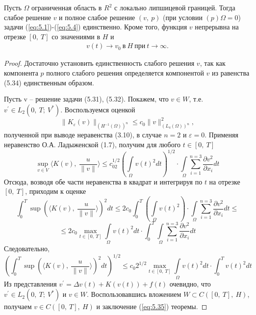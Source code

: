 \begin{theorem}
    Пусть $\Omega$ ограниченная область в $R^2$ с локально липшицевой границей. Тогда слабое решение $v$ и полное слабое решение $(v, \ p)$
    (при условии $(p) \Omega = 0$) задачи (\ref{eq:5.1})-(\ref{eq:5.4}) единственно. Кроме того, функция $v$ непрерывна на отрезке $[0, \ T]$ со значениями в $H$ и
    \begin{equation}\label{eq:5.35}
        \begin{gathered}
            v(t) \rightarrow v_0 \ \textrm{в} \ H \ \textrm{при} \ t \rightarrow \infty.
        \end{gathered}
    \end{equation}
\end{theorem}
\begin{proof}
    Достаточно установить единственность слабого решения $v$, так как компонента $p$ полного слабого решения определяется компонентой $v$
    из равенства (5.34) единственным образом.

    Пусть v -- решение задачи (5.31), (5.32). Покажем, что $v \in W$, т.е. $v^\prime \in L_2(0, \ T; \ V^\ast)$.
    Воспользуемся оценкой
    $$\parallel K_\varepsilon (v) \parallel_{(H^{-1}(\Omega))^n} \le c_0 \parallel v \parallel^2_{(L_4(\Omega))^n},$$
    полученной при выводе неравенства (3.10), в случае $n = 2$ и $\varepsilon = 0$. Применяя неравенство О.А. Ладыженской (1.7), получим для любого $t \in [0, \ T]$
    $$\sup\limits_{v\in V}\langle K(v), \ \frac{u}{\parallel v\parallel}
    \rangle\le c_02^{1/2}(\int\limits_\Omega v(t)^2dt)^{1/2}\cdot\int\limits_\Omega\sum_{i=1}^{n=3}\frac{\partial v^2}{\partial x_i}dt$$
    Отсюда, возводя обе части неравенства в квадрат и интегрируя по $t$ на отрезке $[0, \ T]$, приходим к оценке
    $$\int_0^T \sup(\langle K(v), \ \frac{u}{\parallel v\parallel}\rangle)^2dt \le 2c_0\int_0^T(\int\limits_\Omega v(t)^2)
    \cdot\int\limits_\Omega\sum_{i=1}^{n=3}\frac{\partial v^2}{\partial x_i}dt\le$$
    $$\le 2c_0 \max\limits_{t\in[0, \ T]}\int\limits_\Omega v(t)^2dt\cdot\int_0^T\int\limits_\Omega\sum_{i=1}^{n=3}\frac{\partial v^2}{\partial x_i}dt$$
    Следовательно,
    $$(\int_0^T \sup(\langle K(v), \ \frac{u}{\parallel v\parallel}\rangle)^2dt)^{1/2}\le c_0 2^{1/2}\max\limits_{t\in[0, \ T]}
    \int\limits_\Omega v(t)^2dt\cdot\int_0^T v(t)^2dt$$
    Из представления $v^\prime = \Delta v(t) + K(v(t)) + f(t)$ очевидно, что $v^\prime \in L_2(0, \ T; \ V^\ast)$ и $v \in W$.
    Воспользовавшись вложением $W \subset C([0, \ T], \ H)$, получаем $v \in C([0, \ T], \ H)$ и заключение (\ref{eq:5.35}) теоремы.


\end{proof}
